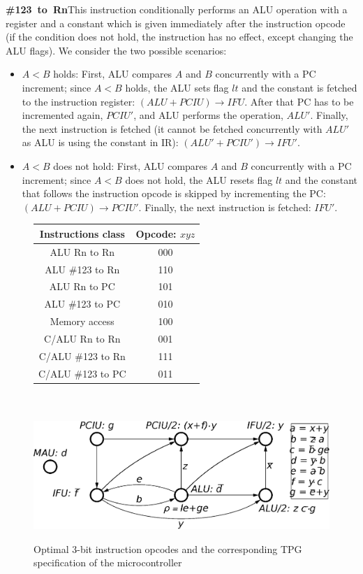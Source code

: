 \textbf{\#123~to~Rn}\quad{}This instruction conditionally performs
an ALU operation with a register and a constant which is given immediately
after the instruction opcode (if the condition does not hold, the
instruction has no effect, except changing the ALU flags). We consider
the two possible scenarios:
\begin{itemize}
\item $A<B$ holds: First, ALU compares $A$ and $B$ concurrently with
a PC increment; since $A<B$ holds, the ALU sets flag $lt$ and the
constant is fetched to the instruction register: $(\mathit{ALU}+\mathit{PCIU})\rightarrow\mathit{IFU}$.
After that PC has to be incremented again, $\mathit{PCIU'}$, and
ALU performs the operation, $\mathit{ALU'}$. Finally, the next instruction
is fetched (it cannot be fetched concurrently with $\mathit{ALU'}$
as ALU is using the constant in IR): $(\mathit{ALU'}+\mathit{PCIU'})\rightarrow\mathit{IFU'}$.
\item $A<B$ does not hold: First, ALU compares $A$ and $B$ concurrently
with a PC increment; since $A<B$ does not hold, the ALU resets flag
$lt$ and the constant that follows the instruction opcode is skipped
by incrementing the PC: $(\mathit{ALU}+\mathit{PCIU})\rightarrow\mathit{PCIU'}$.
Finally, the next instruction is fetched: $\mathit{IFU'}$.
\end{itemize}
\begin{figure}
\centering
\begin{tabular}{||c||||c||}
\hline 
{\small Instructions class} & {\small Opcode: $xyz$}\tabularnewline
\hline 
\hline 
{\small ALU Rn to Rn} & {\small 000}\tabularnewline
\hline 
{\small ALU \#123 to Rn} & {\small 110}\tabularnewline
\hline 
{\small ALU Rn to PC} & {\small 101}\tabularnewline
\hline 
{\small ALU \#123 to PC} & {\small 010}\tabularnewline
\hline 
{\small Memory access} & {\small 100}\tabularnewline
\hline 
{\small C/ALU Rn to Rn} & {\small 001}\tabularnewline
\hline 
{\small C/ALU \#123 to Rn} & {\small 111}\tabularnewline
\hline 
{\small C/ALU \#123 to PC} & {\small 011}\tabularnewline
\hline 
\end{tabular}

~\\
\vspace{5mm}
~\\

\includegraphics[scale=0.5]{fig/CPOG_L_3}

\caption{Optimal 3-bit instruction opcodes and the corresponding TPG specification
of the microcontroller\label{fig:opcodes-and-CG}}
\vspace{-6mm}
\end{figure}


